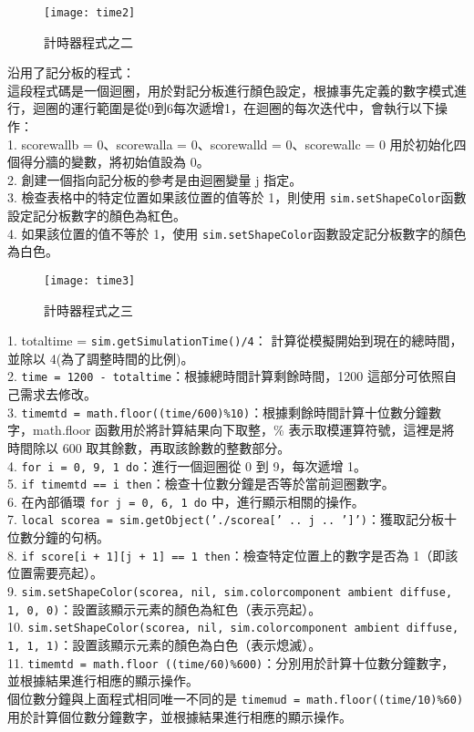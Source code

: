 \begin{figure}[hbt!]
\begin{center}
\texttt{[image: time2]}
\caption{\Large 計時器程式之二}\label{計時器程式之二}
\end{center}
\end{figure} 
沿用了記分板的程式：\\
這段程式碼是一個迴圈，用於對記分板進行顏色設定，根據事先定義的數字模式進行，迴圈的運行範圍是從0到6每次遞增1，在迴圈的每次迭代中，會執行以下操作：\\
1. scorewallb = 0、scorewalla = 0、scorewalld = 0、scorewallc = 0 用於初始化四個得分牆的變數，將初始值設為 0。\\
2. 創建一個指向記分板的參考是由迴圈變量 j 指定。\\
3. 檢查表格中的特定位置如果該位置的值等於 1，則使用 \texttt{sim.setShapeColor}函數設定記分板數字的顏色為紅色。\\
4. 如果該位置的值不等於 1，使用 \texttt{sim.setShapeColor}函數設定記分板數字的顏色為白色。\\
\newpage

\begin{figure}[hbt!]
\begin{center}
\texttt{[image: time3]}
\caption{\Large 計時器程式之三}\label{計時器程式之三}
\end{center}
\end{figure} 
1. totaltime = \texttt{sim.getSimulationTime()/4}： 計算從模擬開始到現在的總時間，並除以 4(為了調整時間的比例)。\\
2. \texttt{time = 1200 - totaltime}：根據總時間計算剩餘時間，1200 這部分可依照自己需求去修改。\\
3. \texttt{timemtd = math.floor((time/600)\%10)}：根據剩餘時間計算十位數分鐘數字，math.floor 函數用於將計算結果向下取整，\% 表示取模運算符號，這裡是將時間除以 600 取其餘數，再取該餘數的整數部分。\\
4. \texttt{for i = 0, 9, 1 do}：進行一個迴圈從 0 到 9，每次遞增 1。\\
5. \texttt{if timemtd == i then}：檢查十位數分鐘是否等於當前迴圈數字。\\
6. 在內部循環 \texttt{for j = 0, 6, 1 do} 中，進行顯示相關的操作。\\
7. \texttt{local scorea = sim.getObject('./scorea[' .. j .. ']')}：獲取記分板十位數分鐘的句柄。\\
8. \texttt{if score[i + 1][j + 1] == 1 then}：檢查特定位置上的數字是否為 1（即該位置需要亮起）。\\
9. \texttt{sim.setShapeColor(scorea, nil, sim.colorcomponent ambient diffuse, {1, 0, 0})}：設置該顯示元素的顏色為紅色（表示亮起）。\\
10. \texttt{sim.setShapeColor(scorea, nil, sim.colorcomponent ambient diffuse, {1, 1, 1})}：設置該顯示元素的顏色為白色（表示熄滅）。\\
11. \texttt{timemtd = math.floor ((time/60)\%600)}：分別用於計算十位數分鐘數字，並根據結果進行相應的顯示操作。\\
個位數分鐘與上面程式相同唯一不同的是 \texttt{timemud = math.floor((time/10)\%60)}用於計算個位數分鐘數字，並根據結果進行相應的顯示操作。\\

